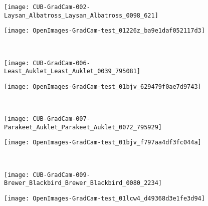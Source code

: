 \documentclass[twocolumn]{article}
\theoremstyle{definition}
\begin{document}
\begin{figure*}
     \centering
     \begin{subfigure}[b]{0.49\textwidth}
         \centering
         \texttt{[image: CUB-GradCam-002-Laysan\_Albatross\_Laysan\_Albatross\_0098\_621]}
     \end{subfigure}
     \hfill
     \begin{subfigure}[b]{0.49\textwidth}
         \centering
         \texttt{[image: OpenImages-GradCam-test\_01226z\_ba9e1daf052117d3]}
     \end{subfigure}
     \\
     \vspace{0.1cm}
     \begin{subfigure}[b]{0.49\textwidth}
         \centering
         \texttt{[image: CUB-GradCam-006-Least\_Auklet\_Least\_Auklet\_0039\_795081]}
     \end{subfigure}
     \hfill
     \begin{subfigure}[b]{0.49\textwidth}
         \centering
         \texttt{[image: OpenImages-GradCam-test\_01bjv\_629479f0ae7d9743]}
     \end{subfigure}
     \\
     \vspace{0.1cm}
     \begin{subfigure}[b]{0.49\textwidth}
         \centering
         \texttt{[image: CUB-GradCam-007-Parakeet\_Auklet\_Parakeet\_Auklet\_0072\_795929]}
     \end{subfigure}
     \hfill
     \begin{subfigure}[b]{0.49\textwidth}
         \centering
         \texttt{[image: OpenImages-GradCam-test\_01bjv\_f797aa4df3fc044a]}
     \end{subfigure}
     \\
     \vspace{0.1cm}
     \begin{subfigure}[b]{0.49\textwidth}
         \centering
         \texttt{[image: CUB-GradCam-009-Brewer\_Blackbird\_Brewer\_Blackbird\_0080\_2234]}
     \end{subfigure}
     \hfill
     \begin{subfigure}[b]{0.49\textwidth}
         \centering
         \texttt{[image: OpenImages-GradCam-test\_01lcw4\_d49368d3e1fe3d94]}
     \end{subfigure}
     \\
     \vspace{0.1cm}
     \begin{subfigure}[b]{0.49\textwidth}

\end{subfigure}
\end{figure*}
\end{document}
